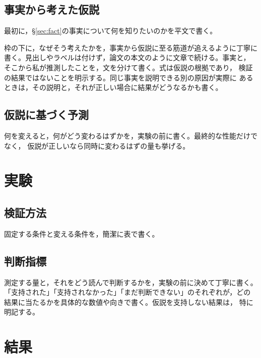 \documentclass[twocolumn, 10pt]{ujarticle}
\begin{document}
\subsection{事実から考えた仮説}\label{sec:hyp}

最初に，\S\ref{sec:fact}の事実について何を知りたいのかを平文で書く。


枠の下に，なぜそう考えたかを，事実から仮説に至る筋道が追えるように丁寧に
書く。見出しやラベルは付けず，論文の本文のように文章で続ける。事実と，
そこから私が推測したことを，文を分けて書く。式は仮説の根拠であり，
検証の結果ではないことを明示する。同じ事実を説明できる別の原因が実際に
あるときは，その説明と，それが正しい場合に結果がどうなるかも書く。

\subsection{仮説に基づく予測}\label{sec:pred}

何を変えると，何がどう変わるはずかを，実験の前に書く。最終的な性能だけでなく，
仮説が正しいなら同時に変わるはずの量も挙げる。

\section{実験}\label{sec:exp}

\subsection{検証方法}\label{sec:method}

固定する条件と変える条件を，簡潔に表で書く。

\subsection{判断指標}\label{sec:criteria}

測定する量と，それをどう読んで判断するかを，実験の前に決めて丁寧に書く。
「支持された」「支持されなかった」「まだ判断できない」のそれぞれが，どの
結果に当たるかを具体的な数値や向きで書く。仮説を支持しない結果は，
特に明記する。

\section{結果}\label{sec:result}
\end{document}
